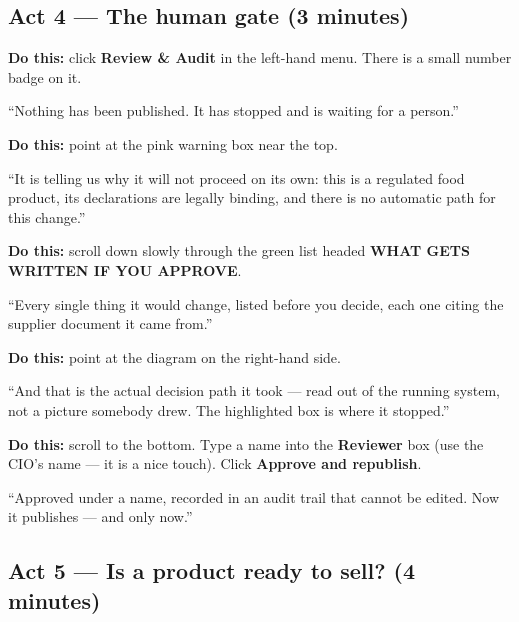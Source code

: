 \documentclass[11pt,a4paper]{article}
\newcommand{\ui}[1]{\textbf{#1}}          %
\begin{document}
\subsection{Act 4 --- The human gate (3 minutes)}

\textbf{Do this:} click \ui{Review \& Audit} in the left-hand menu. There is a
small number badge on it.

\begin{say}
``Nothing has been published. It has stopped and is waiting for a person.''
\end{say}

\textbf{Do this:} point at the pink warning box near the top.

\begin{say}
``It is telling us why it will not proceed on its own: this is a regulated
food product, its declarations are legally binding, and there is no automatic
path for this change.''
\end{say}

\textbf{Do this:} scroll down slowly through the green list headed \ui{WHAT
GETS WRITTEN IF YOU APPROVE}.

\begin{say}
``Every single thing it would change, listed before you decide, each one
citing the supplier document it came from.''
\end{say}

\textbf{Do this:} point at the diagram on the right-hand side.

\begin{say}
``And that is the actual decision path it took --- read out of the running
system, not a picture somebody drew. The highlighted box is where it stopped.''
\end{say}

\textbf{Do this:} scroll to the bottom. Type a name into the \ui{Reviewer} box
(use the CIO's name --- it is a nice touch). Click \ui{Approve and republish}.

\begin{say}
``Approved under a name, recorded in an audit trail that cannot be edited.
Now it publishes --- and only now.''
\end{say}

\subsection{Act 5 --- Is a product ready to sell? (4 minutes)}
\end{document}
